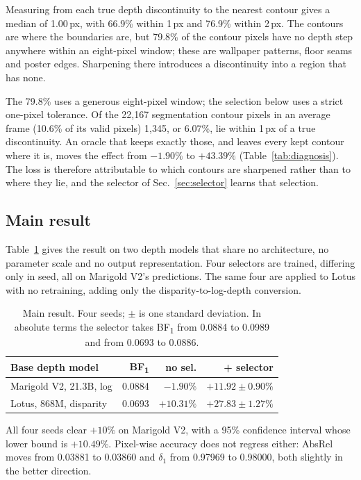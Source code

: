 \documentclass[conference]{IEEEtran}
\newcommand{\bfone}{BF\textsubscript{1}}
\begin{document}
Measuring from each true depth discontinuity to the nearest contour gives a
median of 1.00\,px, with 66.9\% within 1\,px and 76.9\% within 2\,px. The
contours are where the boundaries are, but 79.8\% of the contour pixels have no
depth step anywhere within an eight-pixel window; these are wallpaper patterns,
floor seams and poster edges. Sharpening there introduces a discontinuity into a
region that has none.

The 79.8\% uses a generous eight-pixel window; the selection below uses a strict
one-pixel tolerance. Of the 22{,}167 segmentation contour pixels in an average
frame (10.6\% of its valid pixels) 1{,}345, or 6.07\%, lie within 1\,px of a true
discontinuity. An oracle that keeps exactly those, and leaves every kept contour
where it is, moves the effect from $-1.90\%$ to $+43.39\%$
(Table~\ref{tab:diagnosis}). The loss is therefore attributable to which contours
are sharpened rather than to where they lie, and the selector of
Sec.~\ref{sec:selector} learns that selection.

\subsection{Main result}

Table~\ref{tab:main} gives the result on two depth models that share no
architecture, no parameter scale and no output representation. Four selectors
are trained, differing only in seed, all on Marigold V2's predictions. The same
four are applied to Lotus with no retraining, adding only the
disparity-to-log-depth conversion.

\begin{table}[t]
\caption{Main result. Four seeds; $\pm$ is one standard deviation. In
absolute terms the selector takes \bfone{} from 0.0884 to 0.0989 and from
0.0693 to 0.0886.}
\label{tab:main}
\centering
\setlength{\tabcolsep}{4pt}
\begin{tabular}{lrrr}
\toprule
Base depth model & \bfone{} & no sel. & + selector \\
\midrule
Marigold V2, 21.3B, log & 0.0884 & $-1.90\%$  & $\mathbf{+11.92 \pm 0.90\%}$ \\
Lotus, 868M, disparity & 0.0693 & $+10.31\%$ & $\mathbf{+27.83 \pm 1.27\%}$ \\
\bottomrule
\end{tabular}
\end{table}

All four seeds clear $+10\%$ on Marigold V2, with a 95\% confidence interval
whose lower bound is $+10.49\%$. Pixel-wise accuracy does not regress either:
AbsRel moves from
0.03881 to 0.03860 and $\delta_1$ from 0.97969 to 0.98000, both slightly in the
better direction.
\end{document}
